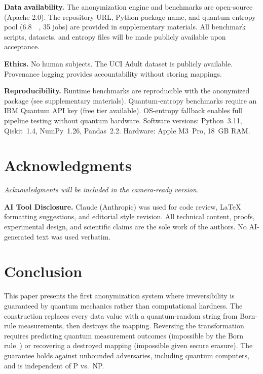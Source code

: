 \documentclass[acmsmall,screen,review,anonymous]{acmart}
\begin{document}
\textbf{Data availability.} The anonymization engine and benchmarks are open-source (Apache-2.0). The repository URL, Python package name, and quantum entropy pool (\SI{6.8}{\mega\byte}, 35 jobs) are provided in supplementary materials. All benchmark scripts, datasets, and entropy files will be made publicly available upon acceptance.

\textbf{Ethics.} No human subjects. The UCI Adult dataset is publicly available. Provenance logging provides accountability without storing mappings.

\textbf{Reproducibility.} Runtime benchmarks are reproducible with the anonymized package (see supplementary materials). Quantum-entropy benchmarks require an IBM Quantum API key (free tier available). OS-entropy fallback enables full pipeline testing without quantum hardware. Software versions: Python~3.11, Qiskit~1.4, NumPy~1.26, Pandas~2.2. Hardware: Apple M3~Pro, 18~GB RAM.

\section*{Acknowledgments}
\emph{Acknowledgments will be included in the camera-ready version.}

\textbf{AI Tool Disclosure.} Claude (Anthropic) was used for code review, LaTeX formatting suggestions, and editorial style revision. All technical content, proofs, experimental design, and scientific claims are the sole work of the authors. No AI-generated text was used verbatim.

\section{Conclusion}
\label{sec:conclusion}

This paper presents the first anonymization system where irreversibility is guaranteed by quantum mechanics rather than computational hardness. The construction replaces every data value with a quantum-random string from Born-rule measurements, then destroys the mapping. Reversing the transformation requires predicting quantum measurement outcomes (impossible by the Born rule~\cite{bell1964epr, hensen2015loophole}) or recovering a destroyed mapping (impossible given secure erasure). The guarantee holds against unbounded adversaries, including quantum computers, and is independent of P vs.\ NP.
\end{document}
